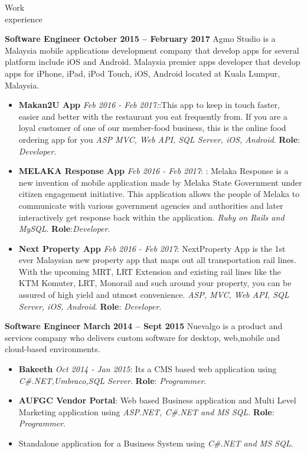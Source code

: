 \documentclass{resume}
\begin{document}
\begin{category}{Work \\experience}
\begin{itemize}
  \end{itemize}
  \citemnobullet \textbf{Software Engineer} \hfill \textbf{October 2015 -- February 2017}
  \citemnobullet Agmo Studio is a Malaysia mobile applications development company that develop apps for several platform include iOS and Android. Malaysia premier apps developer that develop apps for iPhone, iPad, iPod Touch, iOS, Android located at Kuala Lumpur, Malaysia.
  \begin{itemize}
  \item \textbf{Makan2U App} {\em Feb 2016 - Feb 2017:}:This app to keep in touch faster, easier and better with the restaurant you eat frequently from. If you are a loyal customer of one of our member-food business, this is the online food ordering app for you {\em ASP MVC, Web API, SQL Server, iOS, Android}. \textbf{Role}: {\em Developer}. 
  \item \textbf{MELAKA Response App} {\em Feb 2016 - Feb 2017}: : Melaka Response is a new invention of mobile application made by Melaka State Government under citizen engagement initiative. This application allows the people of Melaka to communicate with various government agencies and authorities and later interactively get response back within
  the application.  {\em Ruby on Rails and MySQL}. \textbf{Role}:{\em Developer}.

  \item \textbf{Next Property App} {\em Feb 2016 - Feb 2017}: NextProperty App is the 1st ever Malaysian new property app that maps out all transportation rail lines. With the upcoming MRT, LRT Extension and existing rail lines like the KTM Komuter, LRT, Monorail and such around your property, you can be assured of high yield and utmost convenience. {\em ASP, MVC, Web API, SQL Server, iOS, Android}. \textbf{Role}: {\em Developer}.
  \end{itemize}
  \citemnobullet \textbf{Software Engineer} \hfill \textbf{March 2014 – Sept 2015}
  \citemnobullet Nuevalgo is a product and services company who delivers custom software for desktop, web,mobile and cloud-based environments.
  \begin{itemize} 
  \item \textbf{Bakeeth} {\em Oct 2014 - Jan 2015}: Its a CMS based web application using {\em C\#.NET,Umbraco,SQL Server}. \textbf{Role}: {\em Programmer}.
  \item \textbf{AUFGC Vendor Portal}: Web based Business application and Multi Level Marketing
    application using {\em ASP.NET, C\#.NET and MS SQL}. \textbf{Role}: {\em Programmer}.
  \item Standalone application for a Business System using {\em C\#.NET and MS SQL}.
  \end{itemize}
\end{category}
\end{document}
